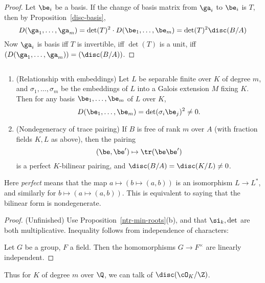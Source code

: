 \begin{proof}
Let $\be_i$ be a basis. 
If the change of basis matrix from $\ga_i$ to $\be_i$ is $T$, then by Proposition~\ref{disc-basis},
\[
D(\ga_1,\ldots, \ga_m)=\det(T)^2\cdot D(\be_1,\ldots, \be_m)
=\det(T)^2\disc(B/A)
\]
Now $\ga_i$ is basis iff $T$ is invertible, iff $\det(T)$ is a unit, iff $(D(\ga_1,\ldots, \ga_m))=(\disc(B/A))$.
\end{proof}
\begin{pr}$\,$
\begin{enumerate}
\item (Relationship with embeddings)
Let $L$ be separable finite over $K$ of degree $m$, and $\sigma_1,\ldots,\sigma_m$ be the embeddings of $L$ into a Galois extension $M$ fixing $K$. Then for any basis $\be_1,\ldots, \be_m$ of $L$ over $K$,
\[
D(\be_1,\ldots, \be_m)=\det(\sigma_i\be_j)^2\neq 0.
\]
\item (Nondegeneracy of trace pairing) If $B$ is free of rank $m$ over $A$ (with fraction fields $K,L$ as above), then the pairing \[(\be,\be')\mapsto \tr(\be\be')\] is a perfect $K$-bilinear pairing, and $\disc(B/A)=\disc(K/L)\neq 0$.
\end{enumerate}
Here {\it perfect} means that the map $a\mapsto (b\mapsto (a,b))$ is an isomorphism $L\to L^*$, and similarly for $b\mapsto (a\mapsto(a,b))$. This is equivalent to saying that the bilinear form is nondegenerate. %
\end{pr}
\begin{proof} (Unfinished) 
Use Proposition~\ref{ntr-min-roots}(b), and that $\si_k,\det$ are both multiplicative. Inequality follows from independence of characters:

Let $G$ be a group, $F$ a field. Then the homomorphisms $G\to F^{\times}$ are linearly independent. 
\end{proof}
Thus for $K$ of degree $m$ over $\Q$, we can talk of $\disc(\cO_K/\Z)$.

